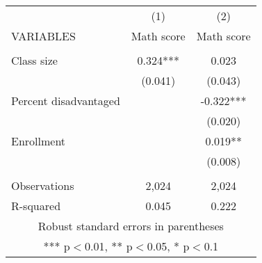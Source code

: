 \documentclass[]{article}
\begin{document}
\begin{tabular}{lcc} \hline
 & (1) & (2) \\
VARIABLES & Math score & Math score \\ \hline
 &  &  \\
Class size & 0.324*** & 0.023 \\
 & (0.041) & (0.043) \\
Percent disadvantaged &  & -0.322*** \\
 &  & (0.020) \\
Enrollment &  & 0.019** \\
 &  & (0.008) \\
 &  &  \\
Observations & 2,024 & 2,024 \\
 R-squared & 0.045 & 0.222 \\ \hline
\multicolumn{3}{c}{ Robust standard errors in parentheses} \\
\multicolumn{3}{c}{ *** p$<$0.01, ** p$<$0.05, * p$<$0.1} \\
\end{tabular}
\end{document}
